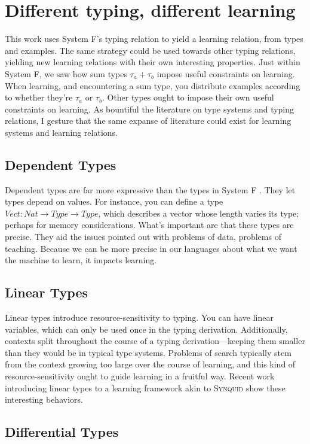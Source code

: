 \section{Different typing, different learning}

This work uses System F's typing relation to yield a learning relation, from types and examples. The same strategy could be used towards other typing relations, yielding new learning relations with their own interesting properties. Just within System F, we saw how sum types $\tau_a+\tau_b$ impose useful constraints on learning. When learning, and encountering a sum type, you distribute examples according to whether they're $\tau_a$ or $\tau_b$. Other types ought to impose their own useful constraints on learning. As bountiful the literature on type systems and typing relations, I gesture that the same expanse of literature could exist for learning systems and learning relations. 

\subsection{Dependent Types}
Dependent types are far more expressive than the types in System F \cite{pierce2005advanced}. They let types depend on values. For instance, you can define a type $Vect:Nat\to Type\to Type$, which describes a vector whose length varies its type; perhaps for memory considerations. What's important are that these types are precise. They aid the issues pointed out with problems of data, problems of teaching. Because we can be more precise in our languages about what we want the machine to learn, it impacts learning. 

\subsection{Linear Types}
Linear types introduce resource-sensitivity to typing. You can have linear variables, which can only be used once in the typing derivation. Additionally, contexts split throughout the course of a typing derivation---keeping them smaller than they would be in typical type systems. Problems of search typically stem from the context growing too large over the course of learning, and this kind of resource-sensitivity ought to guide learning in a fruitful way. Recent work introducing linear types to a learning framework akin to \textsc{Synquid} show these interesting behaviors.

\subsection{Differential Types}

